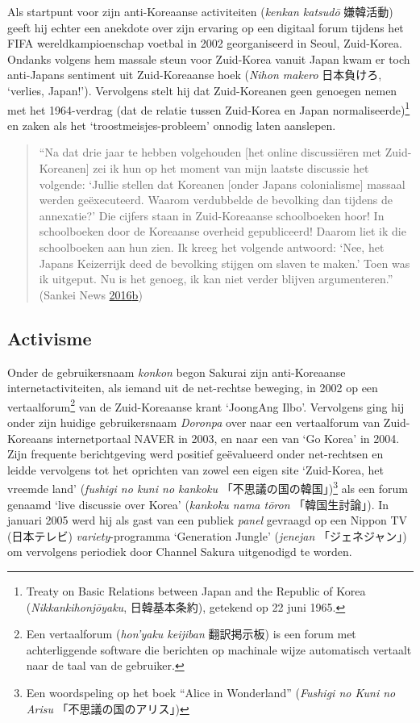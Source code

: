 \documentclass[10.5pt,dutch,]{article}
\begin{document}
Als startpunt voor zijn anti-Koreaanse activiteiten (\emph{kenkan
katsudō} 嫌韓活動) geeft hij echter een anekdote over zijn ervaring op
een digitaal forum tijdens het FIFA wereldkampioenschap voetbal in 2002
georganiseerd in Seoul, Zuid-Korea. Ondanks volgens hem massale steun
voor Zuid-Korea vanuit Japan kwam er toch anti-Japans sentiment uit
Zuid-Koreaanse hoek (\emph{Nihon makero} 日本負けろ, `verlies, Japan!').
Vervolgens stelt hij dat Zuid-Koreanen geen genoegen nemen met het
1964-verdrag (dat de relatie tussen Zuid-Korea en Japan
normaliseerde)\footnote{Treaty on Basic Relations between Japan and the
  Republic of Korea (\emph{Nikkankihonjōyaku}, 日韓基本条約), getekend
  op 22 juni 1965.} en zaken als het `troostmeisjes-probleem' onnodig
laten aanslepen.

\begin{quote}
``Na dat drie jaar te hebben volgehouden {[}het online discussiëren met
Zuid-Koreanen{]} zei ik hun op het moment van mijn laatste discussie het
volgende: `Jullie stellen dat Koreanen {[}onder Japans colonialisme{]}
massaal werden geëxecuteerd. Waarom verdubbelde de bevolking dan tijdens
de annexatie?' Die cijfers staan in Zuid-Koreaanse schoolboeken hoor! In
schoolboeken door de Koreaanse overheid gepubliceerd! Daarom liet ik die
schoolboeken aan hun zien. Ik kreeg het volgende antwoord: `Nee, het
Japans Keizerrijk deed de bevolking stijgen om slaven te maken.' Toen
was ik uitgeput. Nu is het genoeg, ik kan niet verder blijven
argumenteren.'' (Sankei News
\protect\hyperlink{ref-sankeiux5fnewsux5ftokyochiji-senux5f2016-1}{2016}\protect\hyperlink{ref-sankeiux5fnewsux5ftokyochiji-senux5f2016-1}{b})
\end{quote}

\subsection{Activisme}\label{activisme}

Onder de gebruikersnaam \emph{konkon} begon Sakurai zijn anti-Koreaanse
internetactiviteiten, als iemand uit de net-rechtse beweging, in 2002 op
een vertaalforum\footnote{Een vertaalforum (\emph{hon'yaku keijiban}
  翻訳掲示板) is een forum met achterliggende software die berichten op
  machinale wijze automatisch vertaalt naar de taal van de gebruiker.}
van de Zuid-Koreaanse krant `JoongAng Ilbo'. Vervolgens ging hij onder
zijn huidige gebruikersnaam \emph{Doronpa} over naar een vertaalforum
van Zuid-Koreaans internetportaal NAVER in 2003, en naar een van `Go
Korea' in 2004. Zijn frequente berichtgeving werd positief geëvalueerd
onder net-rechtsen en leidde vervolgens tot het oprichten van zowel een
eigen site `Zuid-Korea, het vreemde land' (\emph{fushigi no kuni no
kankoku} 「不思議の国の韓国」)\footnote{Een woordspeling op het boek
  ``Alice in Wonderland'' (\emph{Fushigi no Kuni no Arisu}
  「不思議の国のアリス」)} als een forum genaamd `live discussie over
Korea' (\emph{kankoku nama tōron} 「韓国生討論」). In januari 2005 werd
hij als gast van een publiek \emph{panel} gevraagd op een Nippon TV
(日本テレビ) \emph{variety}-programma `Generation Jungle'
(\emph{jenejan} 「ジェネジャン」) om vervolgens periodiek door Channel
Sakura uitgenodigd te worden.
\end{document}
